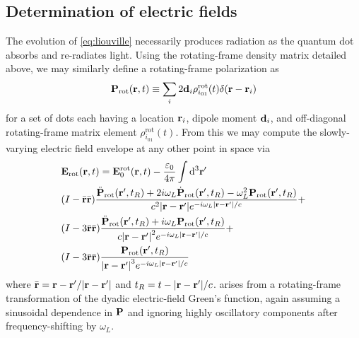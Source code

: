 \documentclass[conference]{IEEEtran}
\begin{document}
\subsection{Determination of electric fields}
The evolution of \cref{eq:liouville} necessarily produces radiation as the quantum dot absorbs and re-radiates light.
Using the rotating-frame density matrix detailed above, we may similarly define a rotating-frame polarization as
\begin{equation}
  \vb{P}_\text{rot}(\vb{r}, t) \equiv \sum_i 2\vb{d}_i \rho_{i_{01}}^\text{rot}(t) \delta(\vb{r} - \vb{r}_i)
  \label{eq:polarization}
\end{equation}
for a set of dots each having a location $\vb{r}_i$, dipole moment $\vb{d}_i$, and off-diagonal rotating-frame matrix element $\rho_{i_{01}}^\text{rot}(t)$.
From this we may compute the slowly-varying electric field envelope at any other point in space via
\begin{equation}
  \begin{aligned}
    & \vb{E}_\text{rot}(\vb{r}, t) = \vb{E}_0^\text{rot}(\vb{r}, t) - \frac{\varepsilon_0}{4\pi} \int \dd[3]{\vb{r}'} \\
    & \qty(I - \bar{\vb{r}}\bar{\vb{r}}) \frac{\ddot{\vb{P}}_\text{rot}(\vb{r}', t_R) + 2 i \omega_L \dot{\vb{P}}_\text{rot}(\vb{r}', t_R) - \omega_L^2 \vb{P}_\text{rot}(\vb{r}', t_R)}{c^2 \abs{\vb{r} - \vb{r}'} e^{-i \omega_L \abs{\vb{r} - \vb{r}'}/c}} + \\
    & \qty(I - 3\bar{\vb{r}}\bar{\vb{r}}) \frac{\ddot{\vb{P}}_\text{rot}(\vb{r}', t_R) + i \omega_L \vb{P}_\text{rot}(\vb{r}', t_R)}{c \abs{\vb{r} - \vb{r}'}^2 e^{-i \omega_L \abs{\vb{r} - \vb{r}'}/c}} + \\
    & \qty(I - 3\bar{\vb{r}}\bar{\vb{r}}) \frac{\vb{P}_\text{rot}(\vb{r}', t_R)}{\abs{\vb{r} - \vb{r}'}^3 e^{-i \omega_L \abs{\vb{r} - \vb{r}'}/c}}
  \label{eq:efield}
  \end{aligned}
\end{equation}
where $\bar{\vb{r}} = \vb{r} - \vb{r}'/\abs{\vb{r} - \vb{r}'}$ and $t_R = t - \abs{\vb{r} - \vb{r}'}/c$.
 arises from a rotating-frame transformation of the dyadic electric-field Green's function, again assuming a sinusoidal dependence in $\vb{P}$ and ignoring highly oscillatory components after frequency-shifting by $\omega_L$.
\end{document}
